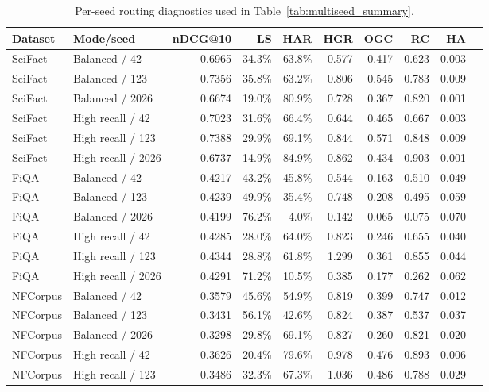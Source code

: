 \begin{table}[!htbp]
\centering
\caption{Per-seed routing diagnostics used in Table~\ref{tab:multiseed_summary}.}
\label{tab:multiseed_raw}
\scriptsize
\setlength{\tabcolsep}{3.0pt}
\begin{tabular}{llrrrrrrrr}
\toprule
Dataset & Mode/seed & nDCG@10 & LS & HAR & HGR & OGC & RC & HA \\
\midrule
SciFact & Balanced / 42 & 0.6965 & 34.3\% & 63.8\% & 0.577 & 0.417 & 0.623 & 0.003 \\
SciFact & Balanced / 123 & 0.7356 & 35.8\% & 63.2\% & 0.806 & 0.545 & 0.783 & 0.009 \\
SciFact & Balanced / 2026 & 0.6674 & 19.0\% & 80.9\% & 0.728 & 0.367 & 0.820 & 0.001 \\
SciFact & High recall / 42 & 0.7023 & 31.6\% & 66.4\% & 0.644 & 0.465 & 0.667 & 0.003 \\
SciFact & High recall / 123 & 0.7388 & 29.9\% & 69.1\% & 0.844 & 0.571 & 0.848 & 0.009 \\
SciFact & High recall / 2026 & 0.6737 & 14.9\% & 84.9\% & 0.862 & 0.434 & 0.903 & 0.001 \\
\midrule
FiQA & Balanced / 42 & 0.4217 & 43.2\% & 45.8\% & 0.544 & 0.163 & 0.510 & 0.049 \\
FiQA & Balanced / 123 & 0.4239 & 49.9\% & 35.4\% & 0.748 & 0.208 & 0.495 & 0.059 \\
FiQA & Balanced / 2026 & 0.4199 & 76.2\% & 4.0\% & 0.142 & 0.065 & 0.075 & 0.070 \\
FiQA & High recall / 42 & 0.4285 & 28.0\% & 64.0\% & 0.823 & 0.246 & 0.655 & 0.040 \\
FiQA & High recall / 123 & 0.4344 & 28.8\% & 61.8\% & 1.299 & 0.361 & 0.855 & 0.044 \\
FiQA & High recall / 2026 & 0.4291 & 71.2\% & 10.5\% & 0.385 & 0.177 & 0.262 & 0.062 \\
\midrule
NFCorpus & Balanced / 42 & 0.3579 & 45.6\% & 54.9\% & 0.819 & 0.399 & 0.747 & 0.012 \\
NFCorpus & Balanced / 123 & 0.3431 & 56.1\% & 42.6\% & 0.824 & 0.387 & 0.537 & 0.037 \\
NFCorpus & Balanced / 2026 & 0.3298 & 29.8\% & 69.1\% & 0.827 & 0.260 & 0.821 & 0.020 \\
NFCorpus & High recall / 42 & 0.3626 & 20.4\% & 79.6\% & 0.978 & 0.476 & 0.893 & 0.006 \\
NFCorpus & High recall / 123 & 0.3486 & 32.3\% & 67.3\% & 1.036 & 0.486 & 0.788 & 0.029 \\

\end{tabular}
\end{table}
